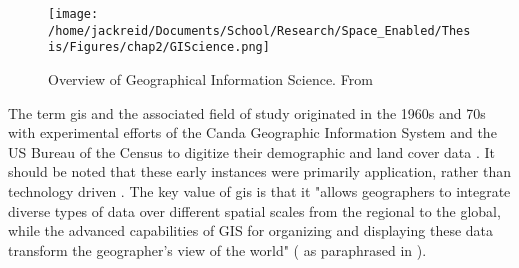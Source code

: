\documentclass[notitlepage]{article}
\begin{document}

\begin{figure}[h]
	\centering
	\texttt{[image: /home/jackreid/Documents/School/Research/Space\_Enabled/Thesis/Figures/chap2/GIScience.png]}
	\caption[Overview of Geographical Information Science]{Overview of Geographical Information Science. From \cite{fotheringhamGeographicInformationScience2007}}
	\label{fig:giscience}
\end{figure}

The term \ac{gis} and the associated field of study originated in the 1960s and 70s with experimental efforts of the Canda Geographic Information System and the US Bureau of the Census to digitize their demographic and land cover data \cite{goodchildGeographicInformationSystems1994}. It should be noted that these early instances were primarily application, rather than technology driven \cite{goodchildGeographicalInformationScience1992}. The key value of \ac{gis} is that it "allows geographers to integrate diverse types of data over different spatial scales from the regional to the global, while the advanced capabilities of GIS for organizing and displaying these data transform the geographer's view of the world" (\cite{tomlinsonPRESIDENTIALADDRESSGEOGRAPHIC1989} as paraphrased in \cite{vereginComputerInnovationAdoption1994}).

\end{document}
